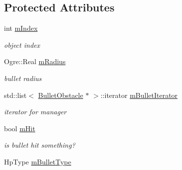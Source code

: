 \subsection*{Protected Attributes}
\begin{DoxyCompactItemize}
\item 
int \hyperlink{class_n_c_t_u_1_1_bullet_obstacle_a25cd3e3ee7a77a4bd51b652201d92dd5}{m\+Index}\hypertarget{class_n_c_t_u_1_1_bullet_obstacle_a25cd3e3ee7a77a4bd51b652201d92dd5}{}\label{class_n_c_t_u_1_1_bullet_obstacle_a25cd3e3ee7a77a4bd51b652201d92dd5}

\begin{DoxyCompactList}\small\item\em object index \end{DoxyCompactList}\item 
Ogre\+::\+Real \hyperlink{class_n_c_t_u_1_1_bullet_obstacle_a2ec54f863d2d04d11c4f1bf0771d36f7}{m\+Radius}\hypertarget{class_n_c_t_u_1_1_bullet_obstacle_a2ec54f863d2d04d11c4f1bf0771d36f7}{}\label{class_n_c_t_u_1_1_bullet_obstacle_a2ec54f863d2d04d11c4f1bf0771d36f7}

\begin{DoxyCompactList}\small\item\em bullet radius \end{DoxyCompactList}\item 
std\+::list$<$ \hyperlink{class_n_c_t_u_1_1_bullet_obstacle}{Bullet\+Obstacle} $\ast$ $>$\+::iterator \hyperlink{class_n_c_t_u_1_1_bullet_obstacle_ac56f8d89eea0be19564990b1a5459916}{m\+Bullet\+Iterator}\hypertarget{class_n_c_t_u_1_1_bullet_obstacle_ac56f8d89eea0be19564990b1a5459916}{}\label{class_n_c_t_u_1_1_bullet_obstacle_ac56f8d89eea0be19564990b1a5459916}

\begin{DoxyCompactList}\small\item\em iterator for manager \end{DoxyCompactList}\item 
bool \hyperlink{class_n_c_t_u_1_1_bullet_obstacle_aba277c2a430e552a2bbcd4ac0d800d0c}{m\+Hit}\hypertarget{class_n_c_t_u_1_1_bullet_obstacle_aba277c2a430e552a2bbcd4ac0d800d0c}{}\label{class_n_c_t_u_1_1_bullet_obstacle_aba277c2a430e552a2bbcd4ac0d800d0c}

\begin{DoxyCompactList}\small\item\em is bullet hit something? \end{DoxyCompactList}\item 
Hp\+Type \hyperlink{class_n_c_t_u_1_1_bullet_obstacle_a8b634c38b5e2172f220709afd534f2c6}{m\+Bullet\+Type}\hypertarget{class_n_c_t_u_1_1_bullet_obstacle_a8b634c38b5e2172f220709afd534f2c6}{}\label{class_n_c_t_u_1_1_bullet_obstacle_a8b634c38b5e2172f220709afd534f2c6}


\end{DoxyCompactItemize}
